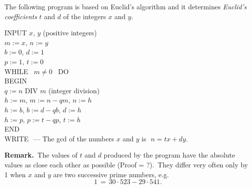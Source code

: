 \documentclass[12pt]{article}
\theoremstyle{definition}
\begin{document}
The following program is based on Euclid's algorithm and it determines {\em Euclid's coefficients} $t$ and $d$ of the integers $x$ and $y$.

INPUT $x$, $y$ \quad  (positive integers)\\
$m := x$, \quad  $n := y$\\
$b := 0$, \quad  $d := 1$\\
$p := 1$, \quad  $t := 0$\\
WHILE \, $m \neq 0$ \, DO\\
BEGIN\\
$q := n$ DIV $m$ \quad (integer division)\\
$h := m$, \quad  $m := n-qm$, \quad  $n := h$\\
$h := b$, \quad  $b := d-qb$, \quad  $d := h$\\
$h := p$, \quad  $p := t-qp$, \quad  $t := h$\\
END\\
WRITE  \,\,--- The gcd of the numbers $x$ and $y$ is\,\, $n = tx+dy$.

\textbf{Remark.} \,The values of $t$ and $d$ produced by the program have the absolute values as close each other as possible (Proof = ?). \,They differ very often only by 1 when $x$ and $y$ are two successive prime numbers, e.g.
     $$1 \,=\, 30\cdot523-29\cdot541.$$

\end{document}
